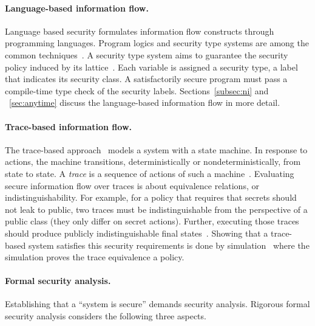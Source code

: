 \paragraph*{Language-based information flow.}
Language based security formulates information flow constructs through programming languages.
Program logics and security type systems are among the common techniques~\cite{frumin2021}.
A security type system aims to guarantee the {security policy} induced by its {lattice}~\cite{marion2011}.
Each variable is assigned a {{security type}}, \ie a label that indicates its {security class}.
A satisfactorily secure program must pass a compile-time type check of the security labels.
Sections~\ref{subsec:ni} and ~\ref{sec:anytime} discuss the {language-based} information flow in more detail.

\paragraph*{Trace-based information flow.}
The trace-based approach~\cite[p. 24]{eggert2014} models a system with a state machine.
In response to actions, the machine transitions, deterministically or nondeterministically, from state to state.
A \emph{trace} is a sequence of actions of such a machine~\cite{nelson2020}.
Evaluating secure information flow over traces is about equivalence relations, 
or {indistinguishability}.
For example, for a policy that requires that secrets should not leak to public, 
two traces must be indistinguishable from the perspective of a public class (they only differ on secret actions).
Further, executing those traces should produce publicly indistinguishable final states~\cite{nelson2020}.
Showing that a trace-based system satisfies this security requirements is done by {simulation}~\cite{piessens2024} 
where the simulation proves the trace equivalence \wrt a policy.

\paragraph*{Formal security analysis.}
Establishing that a \enquote{system is secure} demands security analysis.
Rigorous formal security analysis considers the following three aspects.


